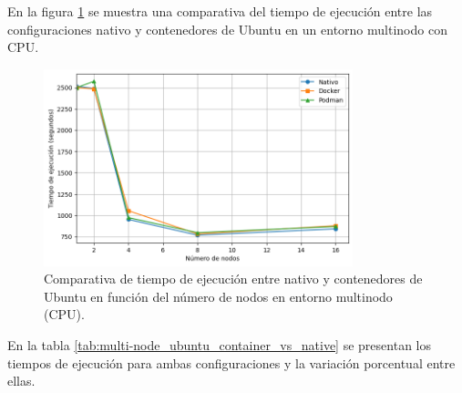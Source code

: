 En la figura \ref{fig:multi-node_ubuntu_container_vs_native_time} se muestra una comparativa del tiempo de ejecución entre las configuraciones nativo y contenedores de Ubuntu en un entorno multinodo con CPU.

\begin{figure}[H]
    \centering
    \includegraphics[width=0.8\textwidth]{imagenes/cap5/multi-node_ubuntu_container_vs_native_time.png}
    \caption{Comparativa de tiempo de ejecución entre nativo y contenedores de Ubuntu en función del número de nodos en entorno multinodo (CPU).}
    \label{fig:multi-node_ubuntu_container_vs_native_time}
\end{figure}

En la tabla \ref{tab:multi-node_ubuntu_container_vs_native} se presentan los tiempos de ejecución para ambas configuraciones y la variación porcentual entre ellas.

